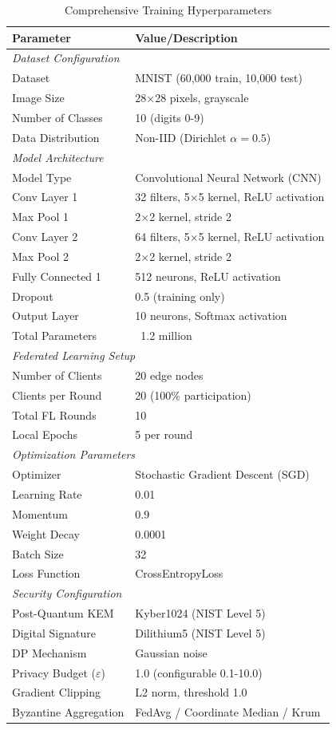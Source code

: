 \documentclass[12pt,a4paper]{article}
\begin{document}
\begin{table}[H]
\centering
\caption{Comprehensive Training Hyperparameters}
\begin{tabular}{ll}
\toprule
\textbf{Parameter} & \textbf{Value/Description} \\
\midrule
\multicolumn{2}{l}{\textit{Dataset Configuration}} \\
Dataset & MNIST (60,000 train, 10,000 test) \\
Image Size & 28×28 pixels, grayscale \\
Number of Classes & 10 (digits 0-9) \\
Data Distribution & Non-IID (Dirichlet $\alpha = 0.5$) \\
\midrule
\multicolumn{2}{l}{\textit{Model Architecture}} \\
Model Type & Convolutional Neural Network (CNN) \\
Conv Layer 1 & 32 filters, 5×5 kernel, ReLU activation \\
Max Pool 1 & 2×2 kernel, stride 2 \\
Conv Layer 2 & 64 filters, 5×5 kernel, ReLU activation \\
Max Pool 2 & 2×2 kernel, stride 2 \\
Fully Connected 1 & 512 neurons, ReLU activation \\
Dropout & 0.5 (training only) \\
Output Layer & 10 neurons, Softmax activation \\
Total Parameters & ~1.2 million \\
\midrule
\multicolumn{2}{l}{\textit{Federated Learning Setup}} \\
Number of Clients & 20 edge nodes \\
Clients per Round & 20 (100\% participation) \\
Total FL Rounds & 10 \\
Local Epochs & 5 per round \\
\midrule
\multicolumn{2}{l}{\textit{Optimization Parameters}} \\
Optimizer & Stochastic Gradient Descent (SGD) \\
Learning Rate & 0.01 \\
Momentum & 0.9 \\
Weight Decay & 0.0001 \\
Batch Size & 32 \\
Loss Function & CrossEntropyLoss \\
\midrule
\multicolumn{2}{l}{\textit{Security Configuration}} \\
Post-Quantum KEM & Kyber1024 (NIST Level 5) \\
Digital Signature & Dilithium5 (NIST Level 5) \\
DP Mechanism & Gaussian noise \\
Privacy Budget ($\varepsilon$) & 1.0 (configurable 0.1-10.0) \\
Gradient Clipping & L2 norm, threshold 1.0 \\
Byzantine Aggregation & FedAvg / Coordinate Median / Krum \\
\bottomrule
\end{tabular}
\end{table}
\end{document}
